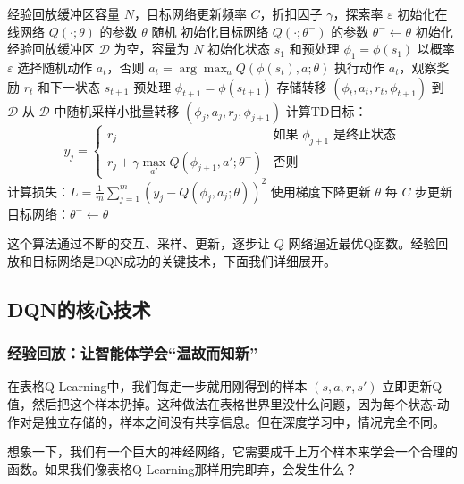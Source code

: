 \documentclass[lang=cn,zihao=-4,a4paper,fontset=windows]{beautybook}
\begin{document}
\begin{algorithm}[H]
\caption{深度Q网络（DQN）算法}
\begin{algorithmic}[1]
\REQUIRE 经验回放缓冲区容量 $N$，目标网络更新频率 $C$，折扣因子 $\gamma$，探索率 $\varepsilon$
\STATE 初始化在线网络 $Q(\cdot; \theta)$ 的参数 $\theta$ 随机
\STATE 初始化目标网络 $Q(\cdot; \theta^-)$ 的参数 $\theta^- \leftarrow \theta$
\STATE 初始化经验回放缓冲区 $\mathcal{D}$ 为空，容量为 $N$
    \STATE 初始化状态 $s_1$ 和预处理 $\phi_1 = \phi(s_1)$
        \STATE 以概率 $\varepsilon$ 选择随机动作 $a_t$，否则 $a_t = \arg\max_{a} Q(\phi(s_t), a; \theta)$
        \STATE 执行动作 $a_t$，观察奖励 $r_t$ 和下一状态 $s_{t+1}$
        \STATE 预处理 $\phi_{t+1} = \phi(s_{t+1})$
        \STATE 存储转移 $(\phi_t, a_t, r_t, \phi_{t+1})$ 到 $\mathcal{D}$
        \STATE 从 $\mathcal{D}$ 中随机采样小批量转移 $(\phi_j, a_j, r_j, \phi_{j+1})$
        \STATE 计算TD目标：
        \[
        y_j = \begin{cases}
        r_j & \text{如果 } \phi_{j+1} \text{ 是终止状态} \\
        r_j + \gamma \max_{a'} Q(\phi_{j+1}, a'; \theta^-) & \text{否则}
        \end{cases}
        \]
        \STATE 计算损失：$L = \frac{1}{m} \sum_{j=1}^{m} (y_j - Q(\phi_j, a_j; \theta))^2$
        \STATE 使用梯度下降更新 $\theta$
        \STATE 每 $C$ 步更新目标网络：$\theta^- \leftarrow \theta$
    \ENDFOR
\ENDFOR
\end{algorithmic}
\end{algorithm}

这个算法通过不断的交互、采样、更新，逐步让 \(Q\) 网络逼近最优Q函数。经验回放和目标网络是DQN成功的关键技术，下面我们详细展开。

\subsection{DQN的核心技术}

\subsubsection{经验回放：让智能体学会“温故而知新”}

在表格Q-Learning中，我们每走一步就用刚得到的样本 \((s,a,r,s')\) 立即更新Q值，然后把这个样本扔掉。这种做法在表格世界里没什么问题，因为每个状态-动作对是独立存储的，样本之间没有共享信息。但在深度学习中，情况完全不同。

想象一下，我们有一个巨大的神经网络，它需要成千上万个样本来学会一个合理的函数。如果我们像表格Q-Learning那样用完即弃，会发生什么？
\end{document}
